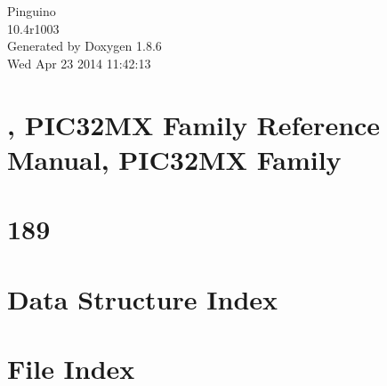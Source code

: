 \documentclass[twoside]{book}
\newcommand{\clearemptydoublepage}{%
  \newpage{\pagestyle{empty}\cleardoublepage}%
}
\begin{document}
\hypersetup{pageanchor=false}
\begin{titlepage}
\vspace*{7cm}
\begin{center}%
{\Large Pinguino \\[1ex]\large 10.\-4r1003 }\\
\vspace*{1cm}
{\large Generated by Doxygen 1.8.6}\\
\vspace*{0.5cm}
{\small Wed Apr 23 2014 11:42:13}\\
\end{center}
\end{titlepage}
\clearemptydoublepage
\tableofcontents
\clearemptydoublepage
{}
\hypersetup{pageanchor=true}

\chapter{, P\-I\-C32\-M\-X Family Reference Manual, P\-I\-C32\-M\-X Family}
\label{186}
\hypertarget{186}{}

\chapter{189}
\label{189}
\hypertarget{189}{}

\chapter{Data Structure Index}

\chapter{File Index}

\end{document}
